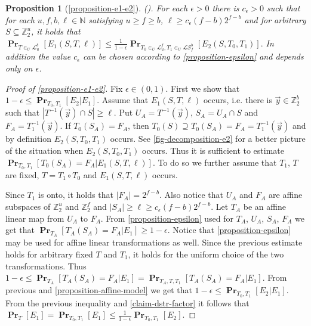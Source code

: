 \documentclass[unicode,review]{siamart1116}
\newcommand{\vecspace}[2]{\mathbb{Z}_{#1}^{#2}}
\newcommand{\binvecspace}[1]{\vecspace{2}{#1}}
\newcommand{\linearmaps}[2]{\mathcal{L}_{#1}^{#2}}
\newcommand{\surjectivelinearmaps}[2]{\mathcal{LS}_{#1}^{#2}}
\newcommand{\probs}[2]{\operatorname{\mathbf{Pr}}_{{#1}}\left[{#2}\right]}
\newtheorem*{propositionrep*}{Proposition}
\numberwithin{theorem}{section}
\begin{document}
\begin{appendix}
\begin{propositionrep*}[\cref{proposition-e1-e2}] \emph{({\cite[Proposition 3.2, p.~11]{alonetal}}).}
For each $\epsilon > 0$ there is $c_\epsilon > 0$ such that for each $u, f, b, \ell \in \mathbb{N}$ satisfying $u \geq f \geq b$, $\ell \geq c_\epsilon (f - b)2^{f-b}$ and for arbitrary $S \subseteq \binvecspace{u}$, it holds that
$
\probs{T \in_U \linearmaps{u}{b}}{E_1(S, T, \ell)} \leq \frac{1}{1 - \epsilon}\probs{T_0 \in_U \linearmaps{u}{f}, T_1 \in_U \surjectivelinearmaps{f}{b}}{E_2(S, T_0, T_1)}.
$
In addition the value $c_\epsilon$ can be chosen according to \cref{proposition-epsilon} and depends only on $\epsilon$.
\end{propositionrep*}
\begin{proof}[Proof of \cref{proposition-e1-e2}]
Fix $\epsilon \in (0, 1)$.
First we show that $1 - \epsilon \leq \probs{T_0, T_1}{E_2 | E_1}$.
Assume that $E_1(S, T, \ell)$ occurs, i.e. there is $\vec{y} \in \binvecspace{b}$ such that $|T^{-1}(\vec{y}) \cap S| \geq \ell$.
Put $U_A = T^{-1}(\vec{y})$, $S_A = U_A \cap S$ and $F_A = T_1^{-1}(\vec{y})$.
If $T_0(S_A) = F_A$, then $T_0(S) \supseteq T_0(S_A) = F_A = T_1^{-1}(\vec{y})$ and by definition $E_2(S, T_0, T_1)$ occurs.
See \cref{fig-decomposition-e2} for a better picture of the situation when $E_2(S, T_0, T_1)$ occurs.
Thus it is sufficient to estimate $\probs{T_0, T_1}{T_0(S_A) = F_A | E_1(S, T, \ell)}$.
To do so we further assume that $T_1$, $T$ are fixed, $T = T_1 \circ T_0$ and $E_1(S, T, \ell)$ occurs.

Since $T_1$ is onto, it holds that $|F_A| = 2^{f-b}$.
Also notice that $U_A$ and $F_A$ are affine subspaces of $\binvecspace{u}$ and $\binvecspace{f}$ and $|S_A| \geq \ell \geq c_\epsilon (f - b)2^{f-b}$.
Let $T_A$ be an affine linear map from $U_A$ to $F_A$.
From \cref{proposition-epsilon} used for $T_A$, $U_A$, $S_A$, $F_A$ we get that $\probs{T_A}{T_A(S_A) = F_A | E_1} \geq 1 - \epsilon$.
Notice that \cref{proposition-epsilon} may be used for affine linear transformations as well.
Since the previous estimate holds for arbitrary fixed $T$ and $T_1$, it holds for the uniform choice of the two transformations. Thus $1 - \epsilon \leq \probs{T_A}{T_A(S_A) = F_A | E_1} = \probs{T_A, T, T_1}{T_A(S_A) = F_A | E_1}$.
From previous and \cref{proposition-affine-model} we get that $1 - \epsilon \leq \probs{T_0, T_1}{E_2 | E_1}$.
From the previous inequality and \cref{claim-dstr-factor} it follows that $\probs{T}{E_1} = \probs{T_0, T_1}{E_1} \leq \frac{1}{1-\epsilon}\probs{T_0, T_1}{E_2}$.
\end{proof}
\end{appendix}
\end{document}
